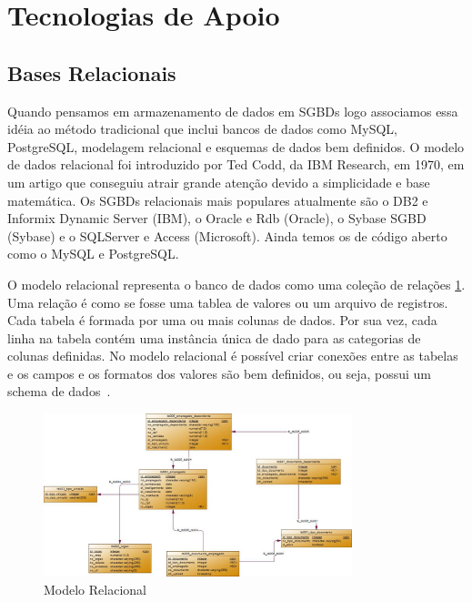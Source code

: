 \section{Tecnologias de Apoio}
\subsection{Bases Relacionais}

Quando pensamos em armazenamento de dados em SGBDs logo associamos essa idéia ao método tradicional que inclui bancos de dados como MySQL, PostgreSQL, modelagem relacional e esquemas de dados bem definidos. O modelo de dados relacional foi introduzido por Ted Codd, da IBM Research, em 1970, em um artigo que conseguiu atrair grande atenção devido a simplicidade e base matemática. Os SGBDs relacionais mais populares atualmente são o DB2 e Informix Dynamic Server (IBM), o Oracle e Rdb (Oracle), o Sybase SGBD (Sybase) e o SQLServer e Access (Microsoft). Ainda temos os de código aberto como o MySQL e PostgreSQL.

O modelo relacional representa o banco de dados como uma coleção de relações \ref{fig:modelorelacional}. Uma relação é como se fosse uma tablea de valores ou um arquivo de registros. Cada tabela é formada por uma ou mais colunas de dados. Por sua vez, cada linha na tabela contém uma instância única de dado para as categorias de colunas definidas. No modelo relacional é possível criar conexões entre as tabelas e os  campos e os formatos dos valores são bem definidos, ou seja, possui um schema de dados~\cite{SBElmasri,nosqlliveup}.

	\begin{figure}[!htbp]
		\begin{center}
			\includegraphics[width=0.8\textwidth]{modelo_relacional}
		\end{center}
		\caption{Modelo Relacional }
		\label{fig:modelorelacional}
	\end{figure}

